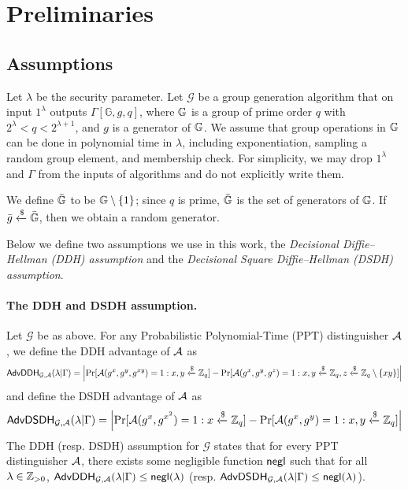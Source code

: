 \section{Preliminaries}

\subsection{Assumptions}

Let $\lambda$ be the security parameter. Let $\mathcal{G}$ be a group generation algorithm that on input $1^\lambda$ outputs $\Gamma[\mathbb{G}, g, q]$, where $\mathbb{G}$ is a group of prime order $q$ with $2^\lambda < q < 2^{\lambda+1}$, and $g$ is a generator of $\mathbb{G}$. We assume that group operations in $\mathbb{G}$ can be done in polynomial time in $\lambda$, including exponentiation, sampling a random group element, and membership check. For simplicity, we may drop $1^\lambda$ and $\Gamma$ from the inputs of algorithms and do not explicitly write them.

We define $\bar{\mathbb{G}}$ to be $\mathbb{G}\setminus\{1\}$; since $q$ is prime, $\bar{\mathbb{G}}$ is the set of generators of $\mathbb{G}$. If $\bar{g}\xleftarrow{\$}\bar{\mathbb{G}}$, then we obtain a random generator.

Below we define two assumptions we use in this work, the \emph{Decisional Diffie--Hellman (DDH) assumption} and the \emph{Decisional Square Diffie--Hellman (DSDH) assumption}.

\paragraph{The DDH and DSDH assumption.}
Let $\mathcal{G}$ be as above. For any Probabilistic Polynomial-Time (PPT) distinguisher $\mathcal{A}$, we define the DDH advantage of $\mathcal{A}$ as
\begin{equation*}
	\mathsf{AdvDDH}_{\mathcal{G},\mathcal{A}}(\lambda | \Gamma) = \left|\Pr[\mathcal{A}(g^x,g^y,g^{xy}) = 1 : x,y\xleftarrow{\$}\mathbb{Z}_q] - \Pr[\mathcal{A}(g^x,g^y,g^z) = 1 : x,y\xleftarrow{\$}\mathbb{Z}_q, z\xleftarrow{\$}\mathbb{Z}_q\setminus\{xy\}]\right|
\end{equation*}
and define the DSDH advantage of $\mathcal{A}$ as
\begin{equation*}
	\mathsf{AdvDSDH}_{\mathcal{G},\mathcal{A}}(\lambda | \Gamma) = \left|\Pr[\mathcal{A}(g^x,g^{x^2}) = 1 : x\xleftarrow{\$}\mathbb{Z}_q] - \Pr[\mathcal{A}(g^x,g^y) = 1 : x,y\xleftarrow{\$}\mathbb{Z}_q]\right|
\end{equation*}
The DDH (resp. DSDH) assumption for $\mathcal{G}$ states that for every PPT distinguisher $\mathcal{A}$, there exists some negligible function $\mathsf{negl}$ such that for all $\lambda\in\mathbb{Z}_{> 0}$, $\mathsf{AdvDDH}_{\mathcal{G},\mathcal{A}}(\lambda | \Gamma)\leq\mathsf{negl}(\lambda)$ (resp. $\mathsf{AdvDSDH}_{\mathcal{G},\mathcal{A}}(\lambda | \Gamma)\leq\mathsf{negl}(\lambda)$).

